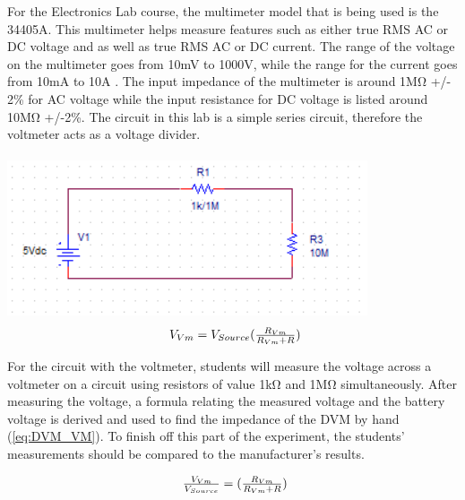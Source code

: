For the Electronics Lab course, the multimeter model that is being used is the 34405A. This multimeter helps measure features such as either true RMS AC or DC voltage and as well as true RMS AC or DC current. The range of the voltage on the multimeter goes from 10mV to 1000V, while the range for the current goes from 10mA to 10A \cite{34405A:3}. The input impedance of the multimeter is around 1M\si{\ohm} +/- 2\% for AC voltage while the input resistance for DC voltage is listed around 10M\si{\ohm} +/-2\%\cite{34405A:6}. The circuit in this lab is a simple series circuit, therefore the voltmeter acts as a voltage divider.\\
\\

\includegraphics{voltmeterfinal.png}
\label{Voltmeter_Pic}
\begin{equation}
\label{eq:volt_div}
\centerline{ $ V_{Vm} = V_{Source}(\frac{R_{Vm}}{R_{Vm} + R}) $} 
\end{equation}

For the circuit with the voltmeter, students will measure the  voltage across a voltmeter on a circuit using resistors of value 1kΩ and 1MΩ simultaneously. After measuring the voltage, a formula relating the measured voltage and the battery voltage is derived and used to find the impedance of the DVM by hand (\ref{eq:DVM_VM}). To finish off this part of the experiment, the students’ measurements should be compared to the manufacturer's results. 

\begin{equation}
\label{eq:DVM_VM}
\centerline{ $ \frac{V_{Vm}}{V_{Source}} = (\frac{R_{Vm}}{R_{Vm} + R}) $} 
\end{equation}


